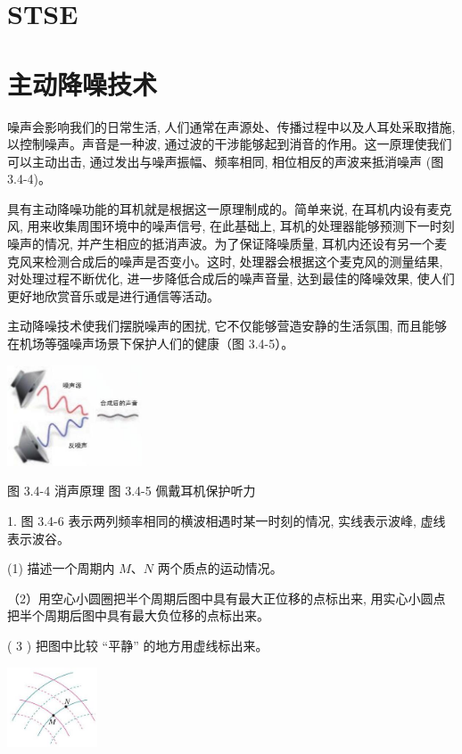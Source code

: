 \documentclass[10pt]{article}
\begin{document}
\section*{STSE}

\section*{主动降噪技术}

噪声会影响我们的日常生活, 人们通常在声源处、传播过程中以及人耳处采取措施, 以控制噪声。声音是一种波, 通过波的干涉能够起到消音的作用。这一原理使我们可以主动出击, 通过发出与噪声振幅、频率相同, 相位相反的声波来抵消噪声 (图 3.4-4)。

具有主动降噪功能的耳机就是根据这一原理制成的。简单来说, 在耳机内设有麦克风, 用来收集周围环境中的噪声信号, 在此基础上, 耳机的处理器能够预测下一时刻噪声的情况, 并产生相应的抵消声波。为了保证降噪质量, 耳机内还设有另一个麦克风来检测合成后的噪声是否变小。这时, 处理器会根据这个麦克风的测量结果, 对处理过程不断优化, 进一步降低合成后的噪声音量, 达到最佳的降噪效果, 使人们更好地欣赏音乐或是进行通信等活动。

主动降噪技术使我们摆脱噪声的困扰, 它不仅能够营造安静的生活氛围, 而且能够在机场等强噪声场景下保护人们的健康（图 3.4-5）。

\begin{center}
\includegraphics[max width=0.3\textwidth]{images/01910e4c-ebb8-7d2c-8f2f-2375bc1d2d12_82_793053.jpg}
\end{center}

图 3.4-4 消声原理 图 3.4-5 佩戴耳机保护听力

1. 图 3.4-6 表示两列频率相同的横波相遇时某一时刻的情况, 实线表示波峰, 虚线表示波谷。

(1) 描述一个周期内 \(M\text{、}N\) 两个质点的运动情况。

（2）用空心小圆圈把半个周期后图中具有最大正位移的点标出来, 用实心小圆点把半个周期后图中具有最大负位移的点标出来。

( 3 ) 把图中比较 “平静” 的地方用虚线标出来。

\begin{center}
\includegraphics[max width=0.2\textwidth]{images/01910e4c-ebb8-7d2c-8f2f-2375bc1d2d12_83_127297.jpg}
\end{center}
\end{document}
